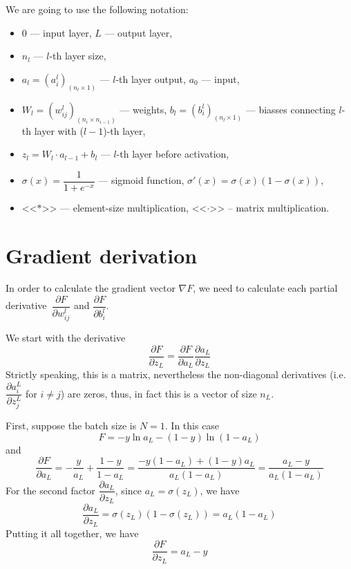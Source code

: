 \documentclass[11pt]{amsart}
\begin{document}
We are going to use the following notation:
\begin{itemize}
    \item $0$ --- input layer, $L$ --- output layer,
    \item $n_l$ --- $l$-th layer size,
    \item $a_l = (a_i^l)_{(n_l \times 1)}$ --- $l$-th layer output, $a_0$ --- input,
    \item $W_l = (w_{ij}^l)_{(n_i \times n_{i - 1})}$ --- weights, $b_l = (b_i^l)_{(n_l \times 1)}$ --- biasses connecting $l$-th layer with ($l - 1$)-th layer,
    \item $z_l = W_l \cdot a_{l - 1} + b_l$ --- $l$-th layer before activation,
    \item $\sigma(x) = \dfrac{1}{1 + e^{-x}}$ --- sigmoid function, $\sigma'(x) = \sigma(x) (1 - \sigma(x))$,
    \item <<$\ast$>> --- element-size multiplication, <<$\cdot$>> -- matrix multiplication.
\end{itemize}



\bigskip

\section{Gradient derivation}

In order to calculate the gradient vector $\nabla F$, we need to calculate each partial derivative~$\dfrac{\partial F}{\partial w_{ij}^l}$ and $\dfrac{\partial F}{\partial b_i^l}$.

We start with the derivative
$$\dfrac{\partial F}{\partial z_L} = \dfrac{\partial F}{\partial a_L} \dfrac{\partial a_L}{\partial z_L}$$
Strictly speaking, this is a matrix, nevertheless the non-diagonal derivatives (i.e. $\dfrac{\partial a_i^L}{\partial z_j^L}$ for $i \neq j$) are zeros, thus, in fact this is a vector of size $n_L$.

First, suppose the batch size is $N = 1$. In this case
$$F = - y \ln a_L - (1 - y) \ln (1 - a_L)$$
and
$$\dfrac{\partial F}{\partial a_L} = - \dfrac{y}{a_L} + \dfrac{1 - y}{1 - a_L}
    = \dfrac{- y (1 - a_L) + (1 - y) a_L}{a_L (1 - a_L)}
    = \dfrac{a_L - y}{a_L (1 - a_L)}$$
For the second factor $\dfrac{\partial a_L}{\partial z_L}$, since $a_L = \sigma (z_L)$, we have
$$\dfrac{\partial a_L}{\partial z_L} = \sigma(z_L) (1 - \sigma (z_L)) = a_L (1 - a_L)$$
Putting it all together, we have
$$\dfrac{\partial F}{\partial z_L} = a_L - y$$
\end{document}
